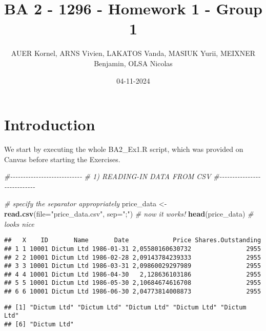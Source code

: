 \documentclass[
]{article}
\title{BA 2 - 1296 - Homework 1 - Group 1}
\author{AUER Kornel, ARNS Vivien, LAKATOS Vanda, MASIUK Yurii, MEIXNER
Benjamin, OLSA Nicolas}
\date{04-11-2024}
\newenvironment{Shaded}{\begin{snugshade}}{\end{snugshade}}
\newcommand{\AttributeTok}[1]{\textcolor[rgb]{0.13,0.29,0.53}{#1}}
\newcommand{\CommentTok}[1]{\textcolor[rgb]{0.56,0.35,0.01}{\textit{#1}}}
\newcommand{\FunctionTok}[1]{\textcolor[rgb]{0.13,0.29,0.53}{\textbf{#1}}}
\newcommand{\NormalTok}[1]{#1}
\newcommand{\OtherTok}[1]{\textcolor[rgb]{0.56,0.35,0.01}{#1}}
\newcommand{\SpecialCharTok}[1]{\textcolor[rgb]{0.81,0.36,0.00}{\textbf{#1}}}
\newcommand{\StringTok}[1]{\textcolor[rgb]{0.31,0.60,0.02}{#1}}
\begin{document}
\maketitle

\section{Introduction}\label{introduction}

We start by executing the whole BA2\_Ex1.R script, which was provided on
Canvas before starting the Exercises.

\begin{Shaded}
\begin{Highlighting}[]
\CommentTok{\#{-}{-}{-}{-}{-}{-}{-}{-}{-}{-}{-}{-}{-}{-}{-}{-}{-}{-}{-}{-}{-}{-}{-}{-}{-}{-}{-}{-}}
\CommentTok{\# 1) READING{-}IN DATA FROM CSV}
\CommentTok{\#{-}{-}{-}{-}{-}{-}{-}{-}{-}{-}{-}{-}{-}{-}{-}{-}{-}{-}{-}{-}{-}{-}{-}{-}{-}{-}{-}{-}}

\CommentTok{\# specify the separator appropriately}
\NormalTok{price\_data }\OtherTok{\textless{}{-}} \FunctionTok{read.csv}\NormalTok{(}\AttributeTok{file=}\StringTok{"price\_data.csv"}\NormalTok{, }\AttributeTok{sep=}\StringTok{";"}\NormalTok{) }\CommentTok{\# now it works!}
\FunctionTok{head}\NormalTok{(price\_data) }\CommentTok{\# looks nice}
\end{Highlighting}
\end{Shaded}

\begin{verbatim}
##   X    ID       Name       Date            Price Shares.Outstanding
## 1 1 10001 Dictum Ltd 1986-01-31 2,05580160630732               2955
## 2 2 10001 Dictum Ltd 1986-02-28 2,09143784239333               2955
## 3 3 10001 Dictum Ltd 1986-03-31 2,09860029297989               2955
## 4 4 10001 Dictum Ltd 1986-04-30   2,128636103186               2955
## 5 5 10001 Dictum Ltd 1986-05-30 2,10684674616708               2955
## 6 6 10001 Dictum Ltd 1986-06-30 2,04773814008873               2955
\end{verbatim}

\begin{Shaded}
\end{Shaded}

\begin{verbatim}
## [1] "Dictum Ltd" "Dictum Ltd" "Dictum Ltd" "Dictum Ltd" "Dictum Ltd"
## [6] "Dictum Ltd"
\end{verbatim}
\end{document}
